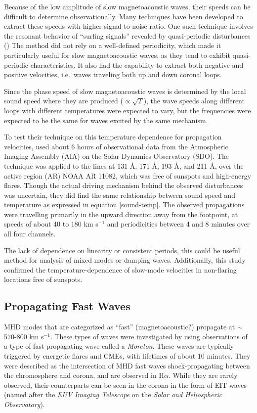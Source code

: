 \documentclass[preprint2]{aastex}
\begin{document}
Because of the low amplitude of slow magnetoacoustic waves, their
speeds can be difficult to determine observationally. Many techniques
have been developed to extract these speeds with higher signal-to-noise
ratio. One such technique
involves the resonant behavior of ``surfing signals''
revealed by quasi-periodic disturbances (\cite{pac_2})
The method did not rely on a well-defined periodicity, which made it
particularly useful for slow magnetoacoustic waves, as they tend to
exhibit quasi-periodic characteristics. It also had the capability
to extract both negative and positive velocities, i.e.\ waves traveling
both up and down coronal loops.

Since the phase speed of slow magnetoacoustic waves is determined by
the local sound speed where they are produced ($\propto\sqrt{T}$),
the wave speeds along
different loops with different temperatures were expected to vary,
but the frequencies were expected to be the same for waves excited
by the same mechanism.

To test their technique on this temperature dependence for propagation
velocities, {\cite{pac_2}} used
about 6 hours of observational data from the
Atmospheric Imaging Assembly (AIA) on the Solar Dynamics Observatory (SDO).
The technique was applied to the lines at
131 \AA{}, 171 \AA{}, 193 \AA{}, and 211 \AA{},
over the active region (AR) NOAA AR 11082, which was free of sunspots
and high-energy flares.
Though the actual driving mechanism behind the observed disturbances
was uncertain, they did find
the same relationship between sound speed and temperature
as expressed in equation {\ref{sound-temp}}.
The observed propagations were
travelling primarily in the upward direction away from the footpoint,
at speeds of about 40 to 180 km s$^{-1}$ and periodicities between 4
and 8 minutes over all four channels.

The lack of dependence on linearity or consistent periods, this could
be useful method for analysis of mixed modes or damping waves.
Additionally, this study confirmed the temperature-dependence of
slow-mode velocities in non-flaring locations free of sunspots.
\subsection{Propagating Fast Waves}%
MHD modes that are categorized as ``fast'' (magnetoacoustic?) propagate
at $\sim$ 570-800 km s$^{-1}$. These types of waves were investigated by
\cite{pfw_1} using observations of a type of fast propagating wave called a
\emph{Moreton}. These waves are
typically triggered by energetic flares and CMEs, with lifetimes of
about 10 minutes.
They were described as the intersection of MHD fast waves shock-propagating
between the chromosphere and corona, and are observed in H$\alpha$.
While they are rarely observed, their
counterparts can be seen in the corona in the form of EIT waves
(named after the \emph{EUV Imaging Telescope} on the
\emph{Solar and Heliospheric Observatory}).
\end{document}
